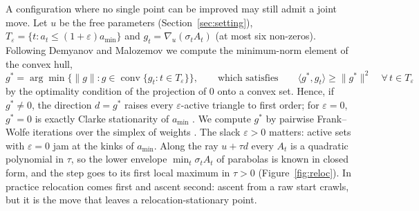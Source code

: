 \documentclass[11pt]{article}
\theoremstyle{remark}
\newcommand{\conv}{\operatorname{conv}}
\newcommand{\amin}{a_{\min}}
\begin{document}
A configuration where no single point can be improved may still admit a joint move. Let $u$ be the free parameters
(Section~\ref{sec:setting}), $T_\varepsilon = \{t : a_t \le (1+\varepsilon)\amin\}$ and
$g_t = \nabla_u (\sigma_t A_t)$ (at most six non-zeros).
Following Demyanov and Malozemov \cite{DM74} we compute the minimum-norm element of the convex hull,
\[
  g^\ast = \arg\min \bigl\{ \|g\| : g \in \conv\{ g_t : t \in T_\varepsilon \} \bigr\},
  \qquad\text{which satisfies}\qquad \langle g^\ast, g_t \rangle \ge \|g^\ast\|^2 \quad \forall\, t \in T_\varepsilon
\]
by the optimality condition of the projection of $0$ onto a convex set. Hence, if $g^\ast \neq 0$, the direction
$d = g^\ast$ raises every $\varepsilon$-active triangle to first order; for $\varepsilon = 0$, $g^\ast = 0$ is exactly
Clarke stationarity of $\amin$ \cite{Clarke83}. We compute $g^\ast$ by pairwise Frank--Wolfe iterations over the
simplex of weights \cite{FW56,LJJ15}. The slack $\varepsilon > 0$ matters: active sets with $\varepsilon = 0$ jam at the kinks of
$\amin$. Along the ray $u + \tau d$ every $A_t$ is a quadratic polynomial in $\tau$, so the lower envelope
$\min_t \sigma_t A_t$ of parabolas is known in closed form, and the step goes to its first local maximum in
$\tau > 0$ (Figure~\ref{fig:reloc}). In practice relocation comes first and
ascent second: ascent from a raw start crawls, but it is the move that leaves a relocation-stationary point.
\end{document}
